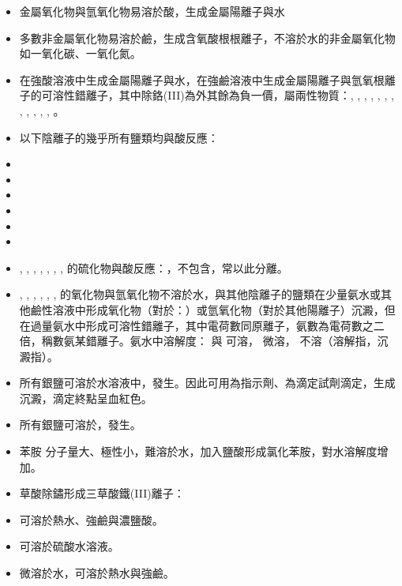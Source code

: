 \documentclass[a4paper,12pt]{report}
\begin{document}
\begin{itemize}
\item 金屬氧化物與氫氧化物易溶於酸，生成金屬陽離子與水
\item 多數非金屬氧化物易溶於鹼，生成含氧酸根根離子，不溶於水的非金屬氧化物如一氧化碳、一氧化氮。
\item 在強酸溶液中生成金屬陽離子與水，在強鹼溶液中生成金屬陽離子與氫氧根離子的可溶性錯離子，其中除鉻(III)為外其餘為負一價，屬兩性物質：, , , , , , , , , , , , 。
\item 以下陰離子的幾乎所有鹽類均與酸反應：
\bit
\item {}
\item {}
\item {}
\item {}
\item {}
\item {}
\eit
\item {}, , , , , , ,  的硫化物與酸反應：，不包含，常以此分離。
\item {}, , , , , ,  的氧化物與氫氧化物不溶於水，與其他陰離子的鹽類在少量氨水或其他鹼性溶液中形成氧化物（對於：）或氫氧化物（對於其他陽離子）沉澱，但在過量氨水中形成可溶性錯離子，其中電荷數同原離子，氨數為電荷數之二倍，稱數氨某錯離子。氨水中溶解度： 與 可溶， 微溶， 不溶（溶解指，沉澱指）。
\item 所有銀鹽可溶於水溶液中，發生。因此可用為指示劑、為滴定試劑滴定，生成沉澱，滴定終點呈血紅色。
\item 所有銀鹽可溶於，發生。
\item 苯胺 分子量大、極性小，難溶於水，加入鹽酸形成氯化苯胺，對水溶解度增加。
\item 草酸除鏽形成三草酸鐵(III)離子：
\item {} 可溶於熱水、強鹼與濃鹽酸。
\item {} 可溶於硫酸水溶液。
\item {} 微溶於水，可溶於熱水與強鹼。
\end{itemize}
\end{document}
